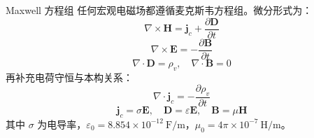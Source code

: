 \documentclass[10pt,aspectratio=169,fontset=none]{ctexbeamer}
\begin{document}
    \begin{frame}{Maxwell 方程组}
        任何宏观电磁场都遵循麦克斯韦方程组。微分形式为：
        \begin{equation}
            \nabla\times \boldsymbol{H} = \boldsymbol{j}_c + \frac{\partial \boldsymbol{D}}{\partial t}
        \end{equation}
        \begin{equation}
            \nabla\times \boldsymbol{E} = -\frac{\partial \boldsymbol{B}}{\partial t}
        \end{equation}
        \begin{equation}
            \nabla\cdot \boldsymbol{D} = \rho_v,\quad \nabla\cdot \boldsymbol{B} = 0
        \end{equation}
        再补充电荷守恒与本构关系：
        \begin{equation}
            \nabla\cdot \boldsymbol{j}_c = -\frac{\partial \rho_v}{\partial t}
        \end{equation}
        \begin{equation}
            \boldsymbol{j}_c = \sigma \boldsymbol{E},\quad \boldsymbol{D}=\varepsilon \boldsymbol{E},\quad \boldsymbol{B}=\mu \boldsymbol{H}
        \end{equation}
        \vspace{0.3em}
        其中 $\sigma$ 为电导率，$\varepsilon_0=8.854\times10^{-12}\ \mathrm{F/m}$，$\mu_0=4\pi\times10^{-7}\ \mathrm{H/m}$。
    \end{frame}
\end{document}
